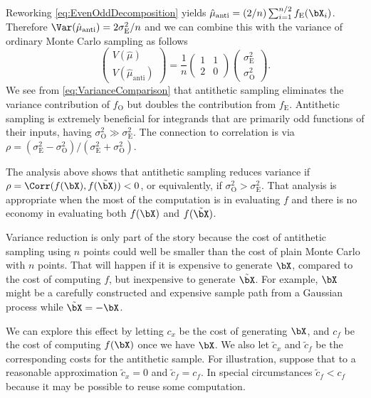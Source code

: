 Reworking \cref{eq:EvenOddDecomposition} yields $\hat{\mu}_{\mathrm{anti}} = (2/n) \sum_{i=1}^{n/2} f_{\mathrm{E}}(\bX_i)$. Therefore $\Var(\hat{\mu}_{\mathrm{anti}}) = 2\sigma_{\mathrm{E}}^2/n$ and we can combine this with the variance of ordinary Monte Carlo sampling as follows
\begin{equation} \label{eq:VarianceComparison}
	\begin{pmatrix} V(\hat{\mu}) \\ V(\hat{\mu}_{\mathrm{anti}}) \end{pmatrix} = \frac{1}{n} \begin{pmatrix} 1 & 1 \\ 2 & 0 \end{pmatrix} \begin{pmatrix} \sigma_{\mathrm{E}}^2 \\ \sigma_{\mathrm{O}}^2 \end{pmatrix}.
\end{equation}
We see from \cref{eq:VarianceComparison} that antithetic sampling eliminates the variance contribution of $f_{\mathrm{O}}$ but doubles the contribution from $f_{\mathrm{E}}$. Antithetic sampling is extremely beneficial for integrands that are primarily odd functions of their inputs, having $\sigma_{\mathrm{O}}^2 \gg \sigma_{\mathrm{E}}^2$. The connection to correlation is via $\rho = (\sigma_{\mathrm{E}}^2 - \sigma_{\mathrm{O}}^2)/(\sigma_{\mathrm{E}}^2 + \sigma_{\mathrm{O}}^2)$.

The analysis above shows that antithetic sampling reduces variance if $\rho = \Corr(f(\bX), f(\tilde{\bX})) < 0$, or equivalently, if $\sigma_{\mathrm{O}}^2 > \sigma_{\mathrm{E}}^2$. That analysis is appropriate when the most of the computation is in evaluating $f$ and there is no economy in evaluating both $f(\bX)$ and $f(\tilde{\bX})$.

Variance reduction is only part of the story because the cost of antithetic sampling using $n$ points could well be smaller than the cost of plain Monte Carlo with $n$ points. That will happen if it is expensive to generate $\bX$, compared to the cost of computing $f$, but inexpensive to generate $\tilde{\bX}$. For example, $\bX$ might be a carefully constructed and expensive sample path from a Gaussian process while $\tilde{\bX} = -\bX$.

We can explore this effect by letting $c_x$ be the cost of generating $\bX$, and $c_f$ be the cost of computing $f(\bX)$ once we have $\bX$. We also let $\tilde{c}_x$ and $\tilde{c}_f$ be the corresponding costs for the antithetic sample. For illustration, suppose that to a reasonable approximation $\tilde{c}_x = 0$ and $\tilde{c}_f = c_f$. In special circumstances $\tilde{c}_f < c_f$ because it may be possible to reuse some computation.

